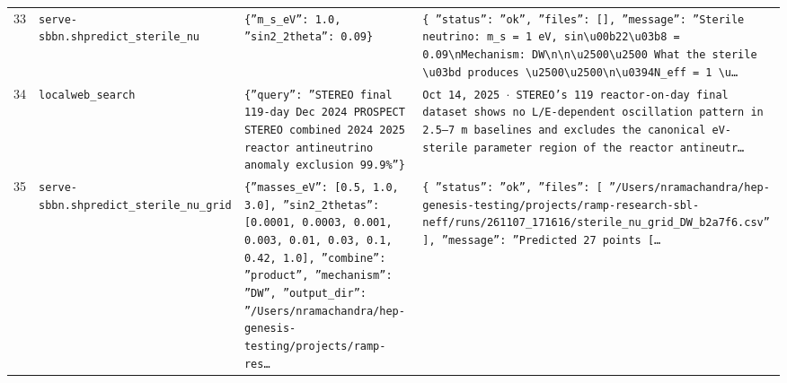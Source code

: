 \documentclass[11pt,a4paper]{article}
\begin{document}
\begin{longtable}{@{}p{}p{}p{}p{}@{}}
33 & \texttt{serve-sbbn.sh}\newline\texttt{predict\_\allowbreak{}sterile\_\allowbreak{}nu} & \texttt{\{''m\_\allowbreak{}s\_\allowbreak{}eV'':\allowbreak{} 1.0,\allowbreak{} ''sin2\_\allowbreak{}2theta'':\allowbreak{} 0.09\}\allowbreak{}} & \texttt{\{   ''status'':\allowbreak{} ''ok'',\allowbreak{}   ''files'':\allowbreak{} []\allowbreak{},\allowbreak{}   ''message'':\allowbreak{} ''Sterile neutrino:\allowbreak{} m\_\allowbreak{}s =\allowbreak{} 1 eV,\allowbreak{} sin\textbackslash{}\allowbreak{}u00b22\textbackslash{}\allowbreak{}u03b8 =\allowbreak{} 0.09\textbackslash{}\allowbreak{}nMechanism:\allowbreak{} DW\textbackslash{}\allowbreak{}n\textbackslash{}\allowbreak{}n\textbackslash{}\allowbreak{}u2500\textbackslash{}\allowbreak{}u2500 What the sterile \textbackslash{}\allowbreak{}u03bd produces \textbackslash{}\allowbreak{}u2500\textbackslash{}\allowbreak{}u2500\textbackslash{}\allowbreak{}n\textbackslash{}\allowbreak{}u0394N\_\allowbreak{}eff =\allowbreak{} 1  \textbackslash{}\allowbreak{}u\ldots{}\allowbreak{}} \\
34 & \texttt{local}\newline\texttt{web\_\allowbreak{}search} & \texttt{\{''query'':\allowbreak{} ''STEREO final 119-day Dec 2024 PROSPECT STEREO combined 2024 2025 reactor antineutrino anomaly exclusion 99.9\%''\}\allowbreak{}} & \texttt{Oct 14,\allowbreak{} 2025 $\cdot$ STEREO's 119 reactor-on-day final dataset shows no L/\allowbreak{}E-dependent oscillation pattern in 2.5--7 m baselines and excludes the canonical eV-sterile parameter region of the reactor antineutr\ldots{}\allowbreak{}} \\
35 & \texttt{serve-sbbn.sh}\newline\texttt{predict\_\allowbreak{}sterile\_\allowbreak{}nu\_\allowbreak{}grid} & \texttt{\{''masses\_\allowbreak{}eV'':\allowbreak{} [0.5,\allowbreak{} 1.0,\allowbreak{} 3.0]\allowbreak{},\allowbreak{} ''sin2\_\allowbreak{}2thetas'':\allowbreak{} [0.0001,\allowbreak{} 0.0003,\allowbreak{} 0.001,\allowbreak{} 0.003,\allowbreak{} 0.01,\allowbreak{} 0.03,\allowbreak{} 0.1,\allowbreak{} 0.42,\allowbreak{} 1.0]\allowbreak{},\allowbreak{} ''combine'':\allowbreak{} ''product'',\allowbreak{} ''mechanism'':\allowbreak{} ''DW'',\allowbreak{} ''output\_\allowbreak{}dir'':\allowbreak{} ''/\allowbreak{}Users/\allowbreak{}nramachandra/\allowbreak{}hep-genesis-testing/\allowbreak{}projects/\allowbreak{}ramp-res\ldots{}\allowbreak{}} & \texttt{\{   ''status'':\allowbreak{} ''ok'',\allowbreak{}   ''files'':\allowbreak{} [     ''/\allowbreak{}Users/\allowbreak{}nramachandra/\allowbreak{}hep-genesis-testing/\allowbreak{}projects/\allowbreak{}ramp-research-sbl-neff/\allowbreak{}runs/\allowbreak{}261107\_\allowbreak{}171616/\allowbreak{}sterile\_\allowbreak{}nu\_\allowbreak{}grid\_\allowbreak{}DW\_\allowbreak{}b2a7f6.csv''   ]\allowbreak{},\allowbreak{}   ''message'':\allowbreak{} ''Predicted 27 points [\ldots{}\allowbreak{}} \\

\end{longtable}
\end{document}
